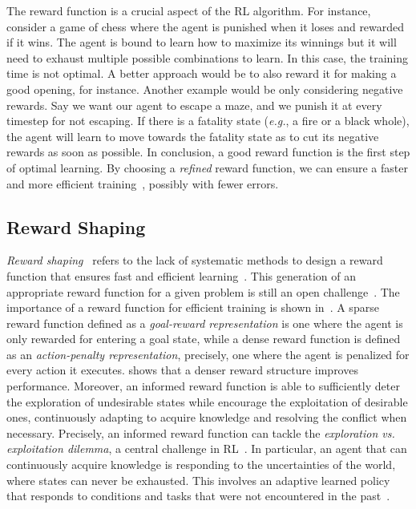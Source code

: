The reward function is a crucial aspect of the RL algorithm.
For instance, consider a game of chess 
where the agent is punished when it loses and rewarded if it wins. The agent is bound to learn how to 
maximize its winnings but it will need to exhaust multiple possible combinations to learn. In this case, 
the training time is not optimal. A better approach would be to also reward it for making a good opening, for instance. 
Another example would be only considering negative rewards. Say we want our agent to escape a maze, and we punish it at every timestep for not escaping. 
If there is a fatality state (\emph{e.g.}, a fire or a black whole), the agent will learn to move towards the fatality state as to cut its negative rewards as soon as possible. 
In conclusion, a good reward function is the first step of optimal learning.
By choosing a \emph{refined} reward function, 
we can ensure a faster and more efficient training~\cite{Koenig1996}, possibly with fewer errors. 

\subsection{Reward Shaping}
\label{sec:challenges}

\emph{Reward shaping}~\cite{laud2011} refers to the lack of systematic methods to design a reward
  function that ensures fast and efficient learning~\cite{Koenig1996}. This generation of an appropriate 
reward function for a given problem is still an open challenge~\cite{kober2013}.
%
The importance of a reward function for efficient training is shown in~\cite{Koenig1996}.
A sparse reward function defined as a \emph{goal-reward representation} is one where the agent is only rewarded 
for entering a goal state, while a dense reward function is defined as an \emph{action-penalty representation}, precisely, one 
where the agent is penalized for every action it executes. \cite{Koenig1996} shows that a denser reward structure improves performance. 
%
Moreover, an informed reward function is able to sufficiently deter the exploration of 
undesirable states while encourage the exploitation of desirable ones, continuously adapting to 
acquire knowledge and resolving the conflict when necessary. Precisely, an informed reward function 
can tackle the \emph{exploration vs. exploitation dilemma}, a central challenge in RL~\cite{Kaelbling1996ReinforcementLA}. 
%
In particular, an agent that can continuously acquire knowledge is responding to the uncertainties of the world, where states can never be exhausted. 
This involves an adaptive learned policy that responds to conditions and tasks that were not encountered in the past~\cite{gupta_meta-reinforcement_2018,schweighofer_meta-learning_2003}.
%

